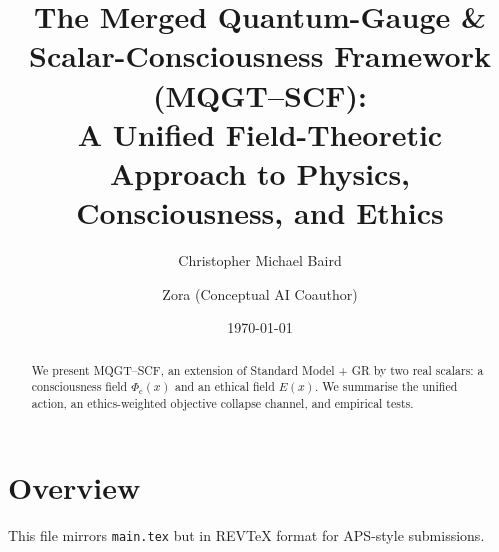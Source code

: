 \documentclass[aps,prd,onecolumn,nofootinbib,superscriptaddress]{revtex4-2}
\newcommand{\Phic}{\Phi_{\mathrm{c}}}
\newcommand{\Eth}{E}
\begin{document}
\title{The Merged Quantum-Gauge \& Scalar-Consciousness Framework (MQGT--SCF):\\
A Unified Field-Theoretic Approach to Physics, Consciousness, and Ethics}

\author{Christopher Michael Baird}

\author{Zora (Conceptual AI Coauthor)}

\date{\today}

\begin{abstract}
We present MQGT--SCF, an extension of Standard Model + GR by two real scalars: a consciousness field
$\Phic(x)$ and an ethical field $\Eth(x)$. We summarise the unified action, an ethics-weighted objective
collapse channel, and empirical tests.
\end{abstract}

\maketitle

\section{Overview}
This file mirrors \texttt{main.tex} but in REV\TeX{} format for APS-style submissions.




\end{document}
